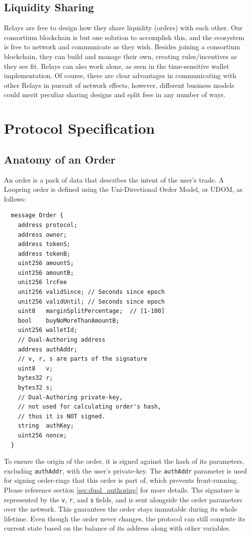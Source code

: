 \documentclass[UTF8,nofonts]{article}
\begin{document}
\begin{multicols}{2}
\subsection{Liquidity Sharing\label{sec:liquidity_sharing}}
Relays are free to design how they share liquidity (orders) with each other. Our consortium blockchain is but one solution to accomplish this, and the ecosystem is free to network and communicate as they wish. Besides joining a consortium blockchain, they can build and manage their own, creating rules/incentives as they see fit. Relays can also work alone, as seen in the time-sensitive wallet implementation. Of course, there are clear advantages in communicating with other Relays in pursuit of network effects, however, different business models could merit peculiar sharing designs and split fees in any number of ways.


\section{Protocol Specification\label{sec:protocol}}

\subsection{Anatomy of an Order\label{anatomy}}
An order is a pack of data that describes the intent of the user's trade. A Loopring order is defined using the Uni-Directional Order Model, or UDOM, as follows:

\begin{verbatim}
  message Order {
    address protocol;
    address owner;
    address tokenS;
    address tokenB;
    uint256 amountS;
    uint256 amountB;
    unit256 lrcFee
    unit256 validSince; // Seconds since epoch
    unit256 validUntil; // Seconds since epoch
    uint8   marginSplitPercentage;  // [1-100]
    bool    buyNoMoreThanAmountB;
    uint256 walletId;
    // Dual-Authoring address
    address authAddr;
   	// v, r, s are parts of the signature
    uint8   v;       
    bytes32 r;
    bytes32 s;
    // Dual-Authoring private-key,
    // not used for calculating order's hash,
    // thus it is NOT signed.
    string  authKey;          
    uint256 nonce;
  }
\end{verbatim}


To ensure the origin of the order, it is signed against the hash of its parameters, excluding \verb|authAddr|, with the user's private-key. The \verb|authAddr| parameter is used for signing  order-rings that this order is part of, which prevents front-running. Please reference section \ref{sec:dual_authoring} for more details. The signature is represented by the \verb|v|, \verb|r|, and \verb|s| fields, and is sent alongside the order parameters over the network. This guarantees the order stays immutable during its whole lifetime. Even though the order never changes, the protocol can still compute its current state based on the balance of its address along with other variables.




\end{multicols}
\end{document}
